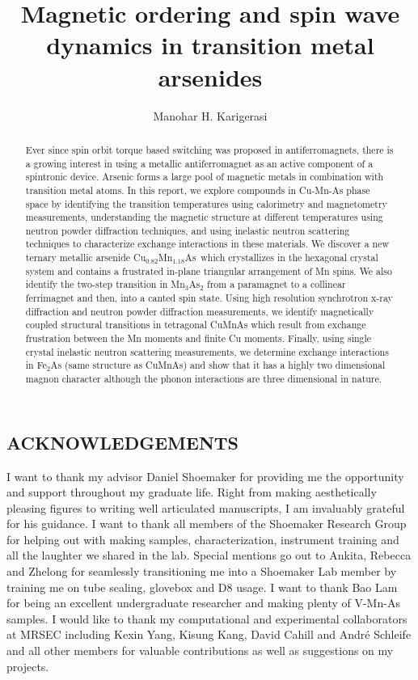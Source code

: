 \documentclass[10pt,doublespacing,edeposit]{uiucthesis2020}
\title{Magnetic ordering and spin wave dynamics in transition metal arsenides}
\author{Manohar H. Karigerasi}
\newcommand*{\cumnas}{Cu$_{0.82}$Mn$_{1.18}$As}
\begin{document}
\maketitle


\begin{frontmatter}

\begin{abstract}
Ever since spin orbit torque based switching was proposed in antiferromagnets, there is a growing interest in using a metallic antiferromagnet as an active component of a spintronic device. Arsenic forms a large pool of magnetic metals in combination with transition metal atoms. In this report, we explore compounds in Cu-Mn-As phase space by identifying the transition temperatures using calorimetry and magnetometry measurements, understanding the magnetic structure at different temperatures using neutron powder diffraction techniques, and using inelastic neutron scattering techniques to characterize exchange interactions in these materials. We discover a new ternary metallic arsenide \cumnas\ which crystallizes in the hexagonal crystal system and contains a frustrated in-plane triangular arrangement of Mn spins. We also identify the two-step transition in Mn$_3$As$_2$ from a paramagnet to a collinear ferrimagnet and then, into a canted spin state. Using high resolution synchrotron x-ray diffraction and neutron powder diffraction measurements, we identify magnetically coupled structural transitions in tetragonal CuMnAs which result from exchange frustration between the Mn moments and finite Cu moments. Finally, using single crystal inelastic neutron scattering measurements, we determine exchange interactions in Fe$_2$As (same structure as CuMnAs) and show that it has a highly two dimensional magnon character although the phonon interactions are three dimensional in nature.
\end{abstract}

\chapter*{\hfill ACKNOWLEDGEMENTS \hfill}

I want to thank my advisor Daniel Shoemaker for providing me the opportunity and support throughout my graduate life. Right from making aesthetically pleasing figures to writing well articulated manuscripts, I am invaluably grateful for his guidance. I want to thank all members of the Shoemaker Research Group for helping out with making samples, characterization, instrument training and all the laughter we shared in the lab. Special mentions go out to Ankita, Rebecca and Zhelong for seamlessly transitioning me into a Shoemaker Lab member by training me on tube sealing, glovebox and D8 usage. I want to thank Bao Lam for being an excellent undergraduate researcher and making plenty of V-Mn-As samples. I would like to thank my computational and experimental collaborators at MRSEC including Kexin Yang, Kisung Kang, David Cahill and Andr\'e Schleife and all other members for valuable contributions as well as suggestions on my projects. 


\end{frontmatter}
\end{document}
